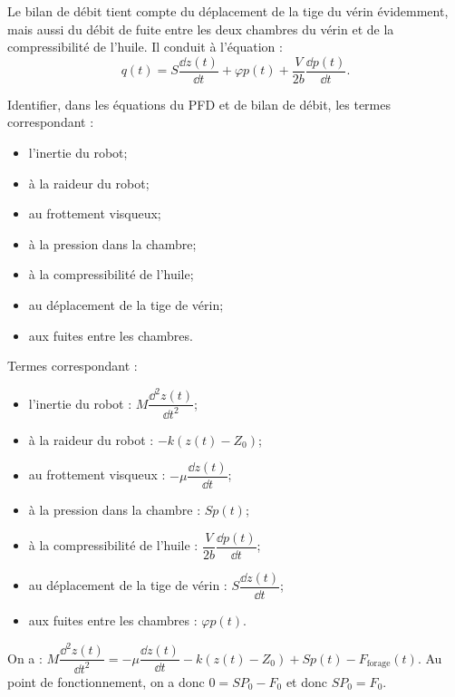 Le bilan de débit tient compte du déplacement de la tige du vérin évidemment, mais aussi du
débit de fuite entre les deux chambres du vérin et de la compressibilité de l’huile. Il conduit à
l’équation :
$$
q(t)=S \dfrac{\dd z (t)}{\dd t} +\varphi p(t) + \dfrac{V}{2b}  \dfrac{\dd p(t)}{\dd t}.
$$





\begin{question}Identifier, dans les équations du PFD et de bilan de débit, les termes correspondant :
\begin{multicols}{2}
\begin{itemize}
\item l’inertie du robot;
\item à la raideur du robot;
\item au frottement visqueux;
\item à la pression dans la chambre;
\item à la compressibilité de l’huile;
\item au déplacement de la tige de vérin;
\item aux fuites entre les chambres.
\end{itemize}
\end{multicols}
\end{question}

\ifprof
\begin{corrige}
Termes correspondant :
\begin{itemize}
\item  l’inertie du robot : $M\dfrac{\dd^2 z(t)}{\dd t^2}$;
\item à la raideur du robot : $ - k\left( z(t) - Z_0\right)$;
\item  au frottement visqueux : $ -\mu \dfrac{\dd z (t)}{\dd t}$;
\item  à la pression dans la chambre : $Sp(t)$;
\item  à la compressibilité de l’huile : $ \dfrac{V}{2b}  \dfrac{\dd p(t)}{\dd t}$;
\item  au déplacement de la tige de vérin : $ S \dfrac{\dd z (t)}{\dd t}$;
\item aux fuites entre les chambres : $\varphi p(t) $.
\end{itemize}
\end{corrige}
\else
\fi

\ifprof
\begin{corrige}
On a : 
$M\dfrac{\dd^2 z(t)}{\dd t^2} = -\mu \dfrac{\dd z (t)}{\dd t} - k\left( z(t) - Z_0\right) +Sp(t)-F_{\text{forage}}(t)$. 
Au point de fonctionnement, on a donc $0 = SP_0-F_0$ et donc $SP_0 = F_0$.
\end{corrige}
\else
\fi



